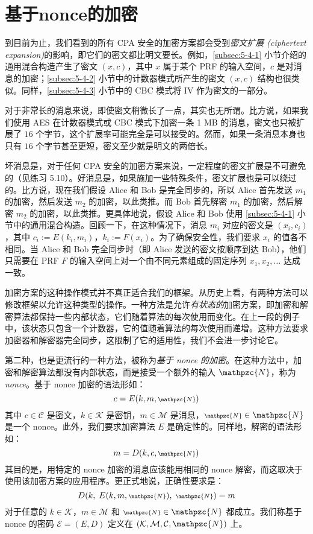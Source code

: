 \section{基于nonce的加密}\label{sec:5-5}

到目前为止，我们看到的所有 CPA 安全的加密方案都会受到\emph{密文扩展 (ciphertext expansion)}的影响，即它们的密文都比明文要长。例如，\ref{subsec:5-4-1} 小节介绍的通用混合构造产生了密文 $(x,c)$，其中 $x$ 属于某个 PRF 的输入空间，$c$ 是对消息的加密；\ref{subsec:5-4-2} 小节中的计数器模式所产生的密文 $(x,c)$ 结构也很类似。同样，\ref{subsec:5-4-3} 小节中的 CBC 模式将 IV 作为密文的一部分。

对于非常长的消息来说，即使密文稍微长了一点，其实也无所谓。比方说，如果我们使用 AES 在计数器模式或 CBC 模式下加密一条 1 MB 的消息，密文也只被扩展了 $16$ 个字节，这个扩展率可能完全是可以接受的。然而，如果一条消息本身也只有 $16$ 个字节甚至更短，密文至少就是明文的两倍长。

坏消息是，对于任何 CPA 安全的加密方案来说，一定程度的密文扩展是不可避免的（见练习 5.10）。好消息是，如果施加一些特殊条件，密文扩展也是可以绕过的。比方说，现在我们假设 Alice 和 Bob 是完全同步的，所以 Alice 首先发送 $m_1$ 的加密，然后发送 $m_2$ 的加密，以此类推。而 Bob 首先解密 $m_1$ 的加密，然后解密 $m_2$ 的加密，以此类推。更具体地说，假设 Alice 和 Bob 使用 \ref{subsec:5-4-1} 小节中的通用混合构造。回顾一下，在这种情况下，消息 $m_i$ 对应的密文是 $(x_i,c_i)$，其中 $c_i:=E(k_i,m_i)$，$k_i:=F(x_i)$。为了确保安全性，我们要求 $x_i$ 的值各不相同。当 Alice 和 Bob 完全同步时（即 Alice 发送的密文按顺序到达 Bob），他们只需要在 PRF $F$ 的输入空间上对一个由不同元素组成的固定序列 $x_1,x_2,\dots$ 达成一致。

加密方案的这种操作模式并不真正适合我们的框架。从历史上看，有两种方法可以修改框架以允许这种类型的操作。一种方法是允许\emph{有状态的}加密方案，即加密和解密算法都保持一些内部状态，它们随着算法的每次使用而变化。在上一段的例子中，该状态只包含一个计数器，它的值随着算法的每次使用而递增。这种方法要求加密器和解密器完全同步，这限制了它的适用性，我们不会进一步讨论它。

第二种，也是更流行的一种方法，被称为\emph{基于 nonce 的加密}。在这种方法中，加密和解密算法都没有内部状态，而是接受一个额外的输入 $\mathpzc{N}$，称为 \emph{nonce}。基于 nonce 加密的语法形如：
\[
c=E(k,m,{\scriptstyle\mathpzc{N}})
\]
其中 $c\in\mathcal{C}$ 是密文，$k\in\mathcal{K}$ 是密钥，$m\in\mathcal{M}$ 是消息，${\scriptstyle\mathpzc{N}}\in\mathpzc{N}$ 是一个 nonce。此外，我们要求加密算法 $E$ 是确定性的。同样地，解密的语法形如：
\[
m=D(k,c,{\scriptstyle\mathpzc{N}})
\]
其目的是，用特定的 nonce 加密的消息应该能用相同的 nonce 解密，而这取决于使用该加密方案的应用程序。更正式地说，正确性要求是：
\[
D(k,\;E(k,m,{\scriptstyle\mathpzc{N}}),\;{\scriptstyle\mathpzc{N}})=m
\]
对于任意的 $k\in\mathcal{K}$，$m\in\mathcal{M}$ 和 ${\scriptstyle\mathpzc{N}}\in\mathpzc{N}$ 都成立。我们称基于 nonce 的密码 $\mathcal{E}=(E,D)$ 定义在 $(\mathcal{K},\mathcal{M},\mathcal{C},\mathpzc{N})$ 上。

